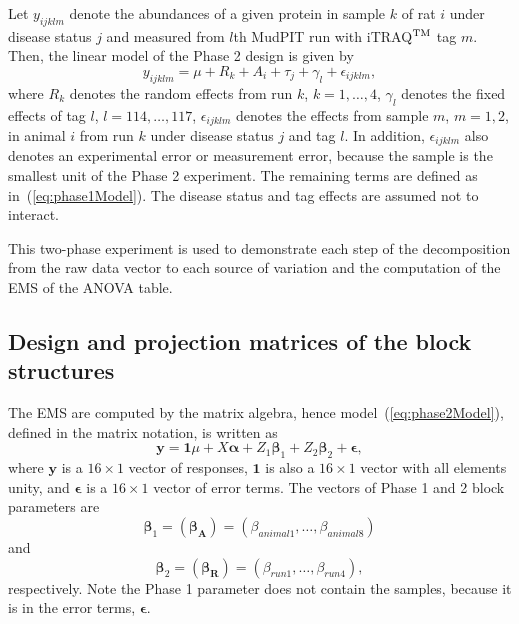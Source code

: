 \documentclass[article]{jss}
\begin{document}
Let $y_{ijklm}$ denote the abundances of a given protein in sample $k$ of rat $i$ under disease status $j$ and measured from $l$th MudPIT run with iTRAQ$^{\rm TM}$ tag $m$. Then, the linear model of the Phase 2 design is given by
\begin{equation}\label{eq:phase2Model}
y_{ijklm}= \mu + R_{k} + A_{i}+ \tau_{j} + \gamma_{l} + \epsilon_{ijklm},
\end{equation}
where $R_{k}$ denotes the random effects from run $k$,  $k=1,\dots, 4$, $\gamma_{l}$ denotes the fixed effects of tag $l$, $l = 114,\dots, 117$, $\epsilon_{ijklm}$ denotes the effects from sample $m$, $m = 1, 2$, in animal $i$ from run $k$ under disease status $j$ and tag $l$. In addition, $\epsilon_{ijklm}$ also denotes an experimental error or measurement error, because the sample is the smallest unit of the Phase 2 experiment. The remaining terms are defined as in~(\ref{eq:phase1Model}). The disease status and tag effects are assumed not to interact.

This two-phase experiment is used to demonstrate each step of the decomposition from the raw data vector to each source of variation and the computation of the EMS of the ANOVA table.

\subsection{Design and projection matrices of the block structures}\label{subsec:desAndProj}
The EMS are computed by the matrix algebra, hence model~(\ref{eq:phase2Model}), defined in the matrix notation, is written as
\begin{equation}\label{eq:matrixTwoPhase}
\bm{y} = \bm{1}\mu + X\bm{\alpha} + Z_1\bm{\beta}_1 + Z_2\bm{\beta}_2 + \bm{\epsilon},
\end{equation}
where $\bm{y}$ is a $16 \times 1$ vector of responses, $\bm{1}$ is also a $16 \times 1$ vector with all elements unity, and $\bm{\epsilon}$ is a $16 \times 1$ vector of error terms. The vectors of Phase 1 and 2 block parameters are
\begin{equation}\label{eq:block1Par}
\bm{\beta}_1= (\bm{\beta_A}) = (\beta_{animal1}, \dots, \beta_{animal8})
\end{equation}
and
\begin{equation}\label{eq:block2Par}
\bm{\beta}_2= (\bm{\beta_R}) = (\beta_{run1}, \dots, \beta_{run4}),
\end{equation}
respectively. Note the Phase 1 parameter does not contain the samples, because it is in the error terms, $\bm{\epsilon}$.
\end{document}
